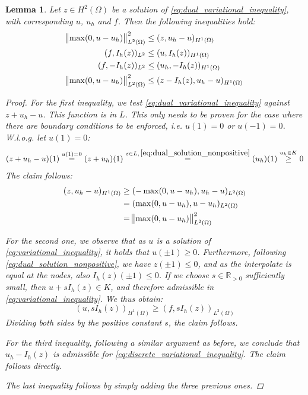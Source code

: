 \documentclass[headsepline,footsepline,footinclude=false,oneside,fontsize=11pt,paper=a4,listof=totoc,bibliography=totoc]{scrbook} %
\newtheorem{lemma}{Lemma}
\begin{document}
\begin{lemma}
	Let $z \in H^2(\Omega)$ be a solution of \eqref{eq:dual_variational_inequality}, with corresponding $u$, $u_h$ and $f$. Then the following inequalities hold:
	\begin{align}
		\norm{\max(0,u-u_h)}_{L^2(\Omega)}^2 &\leq (z,u_h-u)_{H^1(\Omega)} \\
		(f, I_h(z))_{L^2} &\leq (u, I_h(z))_{H^1(\Omega)} \\
		(f, -I_h(z))_{L^2} &\leq (u_h, -I_h(z))_{H^1(\Omega)} \\
		\norm{\max(0,u-u_h)}_{L^2(\Omega)}^2 &\leq (z-I_h(z), u_h - u)_{H^1(\Omega)} \label{eq:scalar_producx_ineq_L2}
	\end{align}
	\begin{proof}
		For the first inequality, we test \eqref{eq:dual_variational_inequality} against $z+u_h-u$. This function is in $L$. This only needs to be proven for the case where there are boundary conditions to be enforced, i.e. $u(1) = 0$ or $u(-1) = 0$. W.l.o.g. let $u(1) = 0$: 
		\begin{equation*}
		(z + u_h - u)(1) \overset{u(1) = 0}{=} (z + u_h)(1) \overset{z \in L,\, \eqref{eq:dual_solution_nonpositive}}{=} (u_h)(1) \overset{u_h \in K}{\geq} 0
		\end{equation*}
		The claim follows:
		\begin{align*}
		(z, u_h-u)_{H^1(\Omega)} &\geq (-\max(0,u-u_h), u_h-u)_{L^2(\Omega)} \\
		&= (\max(0,u-u_h), u-u_h)_{L^2(\Omega)} \\
		&= \norm{\max(0,u-u_h)}_{L^2(\Omega)}^2
		\end{align*}
		
		For the second one, we observe that as $u$ is a solution of \eqref{eq:variational_inequality}, it holds that $u(\pm 1) \geq 0$. Furthermore, following \eqref{eq:dual_solution_nonpositive}, we have $z(\pm 1) \leq 0$, and as the interpolate is equal at the nodes, also $I_h(z)(\pm 1) \leq 0$. If we choose $s \in \mathbb{R}_{>0}$ sufficiently small, then $u + s I_h(z) \in K$, and therefore admissible in \eqref{eq:variational_inequality}. We thus obtain:
		\begin{equation*}
		(u, sI_h(z))_{H^1(\Omega)} \geq (f,sI_h(z))_{L^2(\Omega)}
		\end{equation*}
		Dividing both sides by the positive constant $s$, the claim follows.
		
		For the third inequality, following a similar argument as before, we conclude that $u_h -I_h(z)$ is admissible for \eqref{eq:discrete_variational_inequality}. The claim follows directly.
		
		The last inequality follows by simply adding the three previous ones.
	\end{proof}
\end{lemma}
\end{document}

